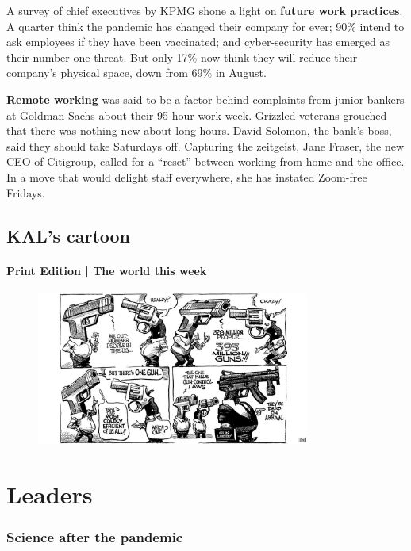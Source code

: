 \documentclass{article}
\begin{document}
A survey of chief executives by KPMG shone a light on \textbf{future work practices}. A quarter think the pandemic has changed their company for ever; 90\% intend to ask employees if they have been vaccinated; and cyber-security has emerged as their number one threat. But only 17\% now think they will reduce their company's physical space, down from 69\% in August. 

\textbf{Remote working} was said to be a factor behind complaints from junior bankers at Goldman Sachs about their 95-hour work week. Grizzled veterans grouched that there was nothing new about long hours. David Solomon, the bank's boss, said they should take Saturdays off. Capturing the zeitgeist, Jane Fraser, the new CEO of Citigroup, called for a ``reset'' between working from home and the office. In a move that would delight staff everywhere, she has instated Zoom-free Fridays. 
\clearpage
\subsubsection{ }
\subsection{KAL's cartoon }
\paragraph{Print Edition | The world this week  \quad \color{gray}{Mar 27th 2021 }}
\begin{figure}[h]
\centering
\includegraphics[width=0.8\textwidth]{images/20210327_wwd000.jpg}
\end{figure}

\clearpage
\section{Leaders }
\subsubsection{Science after the pandemic }
\end{document}
